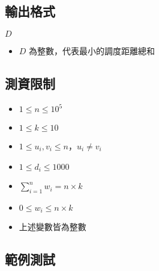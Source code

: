 \subsection{輸出格式}

\begin{format}
\f{
$D$
}
\end{format}

\begin{itemize}
\tightlist
\item
  \begin{math}D\end{math} 為整數，代表最小的調度距離總和
\end{itemize}

\subsection{測資限制}

\begin{itemize}
\tightlist
\item
  \begin{math}1 \le n \le 10^5\end{math}
\item
  \begin{math}1 \le k \le 10\end{math}
\item
  \begin{math}1 \le u_i, v_i \le n\end{math}，\begin{math}u_i \neq v_i\end{math}
\item
  \begin{math}1 \le d_i \le 1000\end{math}
\item
  \begin{math}\displaystyle\sum_{i=1}^n w_i = n\times k\end{math}
\item
  \begin{math}0 \leq w_i \leq n\times k\end{math}
\item
  上述變數皆為整數
\end{itemize}

\subsection{範例測試}

\begin{example}
%
%
\end{example}

